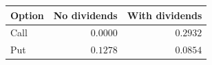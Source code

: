 \begin{tabular}{lrr}
\toprule
Option & No dividends & With dividends \\
\midrule
Call & $0.0000$ & $0.2932$ \\
Put & $0.1278$ & $0.0854$ \\
\bottomrule
\end{tabular}
